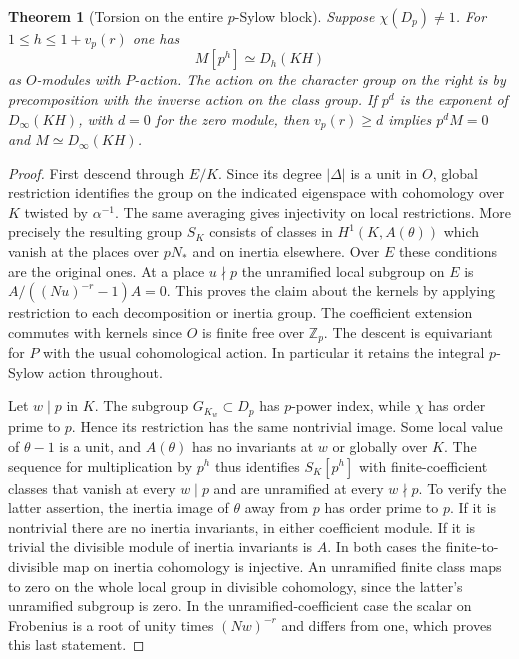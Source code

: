 \documentclass[a4paper,11pt]{article}
\newtheorem{theorem}[proposition]{Theorem}
\theoremstyle{definition}
\theoremstyle{remark}
\newcommand{\ZZ}{\mathbb Z}\newcommand{\ord}{\operatorname{ord}}
\numberwithin{equation}{section}
\begin{document}
\begin{theorem}[Torsion on the entire \(p\)-Sylow block]
\leavevmode\label{thm:wholeblock661}
Suppose \(\chi(D_p)\ne1\). For \(1\le h\le1+v_p(r)\) one has
\[
                        M[p^h]\simeq D_h(KH)
\]
as \(O\)-modules with \(P\)-action. The action on the character
group on the right is by precomposition with the inverse action
on the class group. If \(p^d\) is the exponent of
\(D_\infty(KH)\), with \(d=0\) for the zero module, then
\(v_p(r)\ge d\) implies \(p^d M=0\) and
\(M\simeq D_\infty(KH)\).
\end{theorem}
\begin{proof}
First descend through \(E/K\). Since its degree \(|\Delta|\)
is a unit in \(O\), global restriction identifies the group
on the indicated eigenspace with cohomology over \(K\) twisted
by \(\alpha^{-1}\). The same averaging gives injectivity on
local restrictions. More precisely the resulting group \(S_K\)
consists of classes in \(H^1(K,A(\theta))\) which vanish at the
places over \(pN_*\) and on inertia elsewhere. Over \(E\) these
conditions are the original ones. At a place \(u\nmid p\) the
unramified local subgroup on \(E\) is
\(A/((Nu)^{-r}-1)A=0\). This proves the claim about the kernels
by applying restriction to each decomposition or inertia group.
The coefficient extension commutes with kernels since \(O\) is
finite free over \(\ZZ_p\). The descent is equivariant for \(P\)
with the usual cohomological action. In particular it retains
the integral \(p\)-Sylow action throughout.

Let \(w\mid p\) in \(K\). The subgroup \(G_{K_w}\subset D_p\)
has \(p\)-power index, while \(\chi\) has order prime to \(p\).
Hence its restriction has the same nontrivial image. Some local
value of \(\theta-1\) is a unit, and \(A(\theta)\) has no
invariants at \(w\) or globally over \(K\). The sequence for
multiplication by \(p^h\) thus identifies \(S_K[p^h]\) with
finite-coefficient classes that vanish at every \(w\mid p\)
and are unramified at every \(w\nmid p\). To verify the latter
assertion, the inertia image of \(\theta\) away from \(p\) has
order prime to \(p\). If it is nontrivial there are no inertia
invariants, in either coefficient module. If it is trivial
the divisible module of inertia invariants is \(A\). In both
cases the finite-to-divisible map on inertia cohomology is
injective. An unramified finite class maps to zero on the
whole local group in divisible cohomology, since the latter's
unramified subgroup is zero. In the unramified-coefficient case
the scalar on Frobenius is a root of unity times \((Nw)^{-r}\)
and differs from one, which proves this last statement.


\end{proof}
\end{document}
